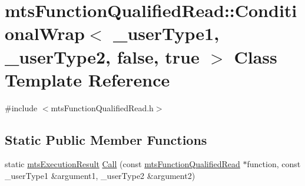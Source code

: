 \hypertarget{classmts_function_qualified_read_1_1_conditional_wrap_3_01__user_type1_00_01__user_type2_00_01false_00_01true_01_4}{\section{mts\-Function\-Qualified\-Read\-:\-:Conditional\-Wrap$<$ \-\_\-user\-Type1, \-\_\-user\-Type2, false, true $>$ Class Template Reference}
\label{classmts_function_qualified_read_1_1_conditional_wrap_3_01__user_type1_00_01__user_type2_00_01false_00_01true_01_4}
}


{\ttfamily \#include $<$mts\-Function\-Qualified\-Read.\-h$>$}

\subsection*{Static Public Member Functions}
\begin{DoxyCompactItemize}
\item 
static \hyperlink{classmts_execution_result}{mts\-Execution\-Result} \hyperlink{classmts_function_qualified_read_1_1_conditional_wrap_3_01__user_type1_00_01__user_type2_00_01false_00_01true_01_4_a8fb99e05690297fa1bb2bd571fa2e192}{Call} (const \hyperlink{classmts_function_qualified_read}{mts\-Function\-Qualified\-Read} $\ast$function, const \-\_\-user\-Type1 \&argument1, \-\_\-user\-Type2 \&argument2)
\end{DoxyCompactItemize}


